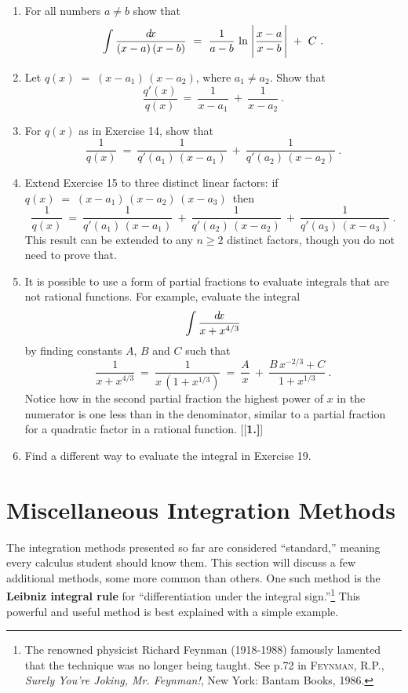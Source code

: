 {\begin{enumerate}[\bfseries 1.]
[{[\bfseries 1.]}]
\item For all numbers $a \ne b$ show that
\[
\int \frac{d\!x}{(x-a)\,(x-b)} ~=~ \frac{1}{a-b}\,\ln\;\Biggl\lvert\mspace{1mu}\frac{x-a}{x-b}\mspace{1mu}\Biggr\rvert ~+~ C ~.
\]
 \item Let $q(x) \;=\; (x-a_1)\,(x-a_2)$, where $a_1 \ne a_2$. Show that
\[
\frac{q'(x)}{q(x)} ~=~ \frac{1}{x-a_1} ~+~ \frac{1}{x-a_2} ~.
\]
 \item For $q(x)$ as in Exercise 14, show that
\[
\frac{1}{q(x)} ~=~ \frac{1}{q'(a_1)\,(x-a_1)} ~+~ \frac{1}{q'(a_2)\,(x-a_2)} ~.
\]
 \item Extend Exercise 15 to three distinct linear factors: if
  $q(x) \;=\; (x-a_1)\,(x-a_2)\,(x-a_3)\,$ then
\[
\frac{1}{q(x)} ~=~ \frac{1}{q'(a_1)\,(x-a_1)} ~+~ \frac{1}{q'(a_2)\,(x-a_2)} 
~+~ \frac{1}{q'(a_3)\,(x-a_3)}~.
\]
This result can be extended to any $n \ge 2$ distinct factors, though you do not
need to prove that.
 \item It is possible to use a form of partial fractions to evaluate integrals
 that are not rational functions. For example, evaluate the integral
\[
\int \frac{d\!x}{x + x^{4/3}}
\]
by finding constants $A$, $B$ and $C$ such that
\[
\frac{1}{x + x^{4/3}} ~=~ \frac{1}{x\,(1 + x^{1/3})} ~=~
\frac{A}{x} ~+~ \frac{B\,x^{-2/3} + C}{1 + x^{1/3}} ~.
\]
Notice how in the second partial fraction the highest power of $x$ in the
numerator is one less than in the denominator, similar to a partial fraction for
a quadratic factor in a rational function.
[{[\bfseries 1.]}]
 \item Find a different way to evaluate the integral in Exercise 19.
\end{enumerate}
}
\newpage
\section{Miscellaneous Integration Methods}\label{sec:misc-integration-methods}
The integration methods presented so far are considered ``standard,'' meaning
every calculus student should know them. This section will discuss a few
additional methods, some more common than others. One such method is the
\textbf{Leibniz integral rule} for ``differentiation under the integral
sign.''\footnote{The renowned physicist Richard Feynman (1918-1988) famously
lamented that the technique was no longer being taught. See p.72 in
\textsc{Feynman, R.P.}, \emph{Surely You're Joking, Mr. Feynman!}, New York:
Bantam Books, 1986.} This powerful and useful method is best explained with a
simple example.

